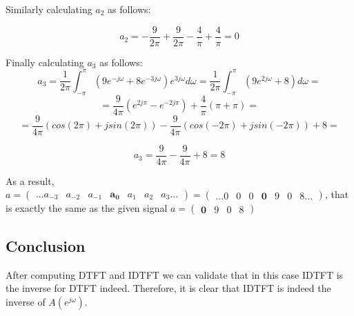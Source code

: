 \documentclass[12pt,a4paper]{article}
\begin{document}
\begin{itemize}
      
        
        Similarly calculating $a_2$ as follows:
        
        $$ a_2 = - \frac{9}{2\pi} + \frac{9}{2\pi} - \frac{4}{\pi} + \frac{4}{\pi} = 0$$
        
        Finally calculating $a_3$ as follows:
        $$ a_3 =  \frac{1}{2\pi} \int_{-\pi}^{\pi} (9e^{-j\omega} + 8e^{-3j\omega})e^{3j\omega}d\omega = \frac{1}{2\pi} \int_{-\pi}^{\pi} (9e^{2j\omega} + 8)d\omega =$$
        $$ =\frac{9}{4\pi}(e^{2j\pi} - e^{-2j\pi}) + \frac{4}{\pi}(\pi +\pi) =$$
        $$ = \frac{9}{4\pi}(cos(2\pi) + jsin(2\pi)) - \frac{9}{4\pi}(cos(-2\pi) + jsin(-2\pi)) + 8 = $$
        
        $$  a_3 = \frac{9}{4\pi} - \frac{9}{4\pi} + 8 = 8 $$

    As a result, $a = \begin{pmatrix} ...a_{-3} & a_{-2} & a_{-1} & \boldsymbol{a_0} & a_1 & a_2 & a_3... \end{pmatrix} = \begin{pmatrix} ...0 & 0 & 0 & \boldsymbol{0} & 9 & 0 & 8... \end{pmatrix}$, that is exactly the same as the given signal $a = \begin{pmatrix} \boldsymbol{0} & 9 & 0 & 8 \end{pmatrix}$\\

\end{itemize}
\subsection{Conclusion}
After computing DTFT and IDTFT we can validate that in this case IDTFT is the inverse for DTFT indeed. Therefore, it is clear that IDTFT is indeed the inverse of $A(e^{j\omega})$.
\end{document}
